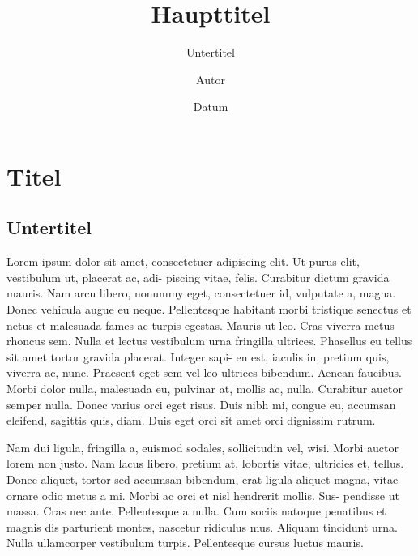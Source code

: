 \documentclass[ngerman,titlepage]{uzhpub}
\begin{document}
\title{Haupttitel}

\subtitle{Untertitel}

\author{Autor}

\date{Datum}

\maketitle

\tableofcontents{}
\clearpage


\section{Titel}

\subsection{Untertitel}

Lorem ipsum dolor sit amet, consectetuer adipiscing elit. Ut purus
elit, vestibulum ut, placerat ac, adi- piscing vitae, felis. Curabitur
dictum gravida mauris. Nam arcu libero, nonummy eget, consectetuer
id, vulputate a, magna. Donec vehicula augue eu neque. Pellentesque
habitant morbi tristique senectus et netus et malesuada fames ac turpis
egestas. Mauris ut leo. Cras viverra metus rhoncus sem. Nulla et lectus
vestibulum urna fringilla ultrices. Phasellus eu tellus sit amet tortor
gravida placerat. Integer sapi- en est, iaculis in, pretium quis,
viverra ac, nunc. Praesent eget sem vel leo ultrices bibendum. Aenean
faucibus. Morbi dolor nulla, malesuada eu, pulvinar at, mollis ac,
nulla. Curabitur auctor semper nulla. Donec varius orci eget risus.
Duis nibh mi, congue eu, accumsan eleifend, sagittis quis, diam. Duis
eget orci sit amet orci dignissim rutrum. 

Nam dui ligula, fringilla a, euismod sodales, sollicitudin vel, wisi.
Morbi auctor lorem non justo. Nam lacus libero, pretium at, lobortis
vitae, ultricies et, tellus. Donec aliquet, tortor sed accumsan bibendum,
erat ligula aliquet magna, vitae ornare odio metus a mi. Morbi ac
orci et nisl hendrerit mollis. Sus- pendisse ut massa. Cras nec ante.
Pellentesque a nulla. Cum sociis natoque penatibus et magnis dis parturient
montes, nascetur ridiculus mus. Aliquam tincidunt urna. Nulla ullamcorper
vestibulum turpis. Pellentesque cursus luctus mauris. 
\end{document}
